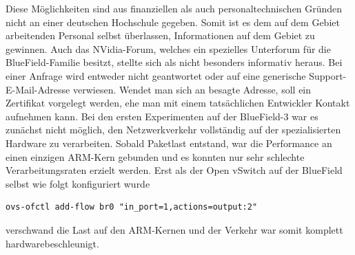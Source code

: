 Diese Möglichkeiten sind aus finanziellen als auch personaltechnischen Gründen nicht an einer deutschen Hochschule gegeben. Somit ist es dem auf dem Gebiet arbeitenden Personal selbst überlassen, Informationen auf dem Gebiet zu gewinnen. Auch das NVidia-Forum, welches ein spezielles Unterforum für die BlueField-Familie besitzt, stellte sich als nicht besonders informativ heraus. Bei einer Anfrage wird entweder nicht geantwortet oder auf eine generische Support-E-Mail-Adresse verwiesen. Wendet man sich an besagte Adresse, soll ein Zertifikat vorgelegt werden, ehe man mit einem tatsächlichen Entwickler Kontakt aufnehmen kann.\newline
Bei den ersten Experimenten auf der BlueField-3 war es zunächst nicht möglich, den Netzwerkverkehr vollständig auf der spezialisierten Hardware zu verarbeiten. Sobald Paketlast entstand, war die Performance an einen einzigen ARM-Kern gebunden und es konnten nur sehr schlechte Verarbeitungsraten erzielt werden. Erst als der Open vSwitch auf der BlueField selbst wie folgt konfiguriert wurde
\begin{verbatim}
ovs-ofctl add-flow br0 "in_port=1,actions=output:2"
\end{verbatim}
verschwand die Last auf den ARM-Kernen und der Verkehr war somit komplett hardwarebeschleunigt.
